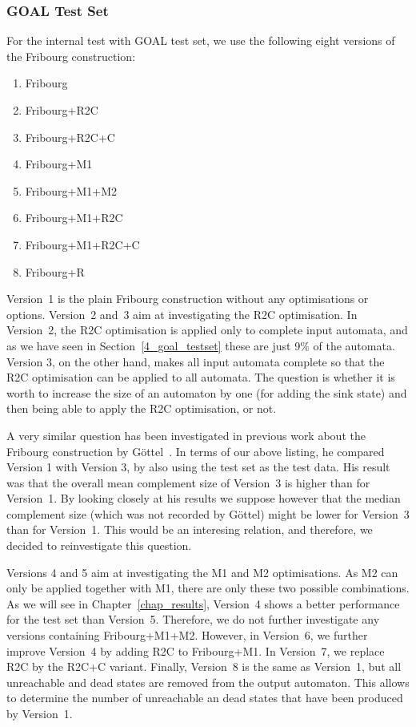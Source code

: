 \subsubsection{GOAL Test Set}
For the internal test with GOAL test set, we use the following eight versions of the Fribourg construction:
\begin{enumerate}
\item Fribourg
\item Fribourg+R2C
\item Fribourg+R2C+C
\item Fribourg+M1
\item Fribourg+M1+M2
\item Fribourg+M1+R2C
\item Fribourg+M1+R2C+C
\item Fribourg+R
\end{enumerate}

Version~1 is the plain Fribourg construction without any optimisations or options. Version~2 and~3 aim at investigating the R2C optimisation. In Version~2, the R2C optimisation is applied only to complete input automata, and as we have seen in Section~\ref{4_goal_testset} these are just 9\% of the automata. Version 3, on the other hand, makes all input automata complete so that the R2C optimisation can be applied to all automata. The question is whether it is worth to increase the size of an automaton by one (for adding the sink state) and then being able to apply the R2C optimisation, or not.

A very similar question has been investigated in previous work about the Fribourg construction by Göttel~\cite{2013_bsc_goettel}. In terms of our above listing, he compared Version 1 with Version 3, by also using the \goal{} test set as the test data. His result was that the overall mean complement size of Version~3 is higher than for Version~1. By looking closely at his results we suppose however that the median complement size (which was not recorded by Göttel) might be lower for Version~3 than for Version~1. This would be an interesing relation, and therefore, we decided to reinvestigate this question. 

Versions 4 and 5 aim at investigating the M1 and M2 optimisations. As M2 can only be applied together with M1, there are only these two possible combinations. As we will see in Chapter~\ref{chap_results}, Version~4 shows a better performance for the \goal{} test set than Version~5. Therefore, we do not further investigate any versions containing Fribourg+M1+M2. However, in Version~6, we further improve Version~4 by adding R2C to Fribourg+M1. In Version~7, we replace R2C by the R2C+C variant. Finally, Version~8 is the same as Version~1, but all unreachable and dead states are removed from the output automaton. This allows to determine the number of unreachable an dead states that have been produced by Version~1.

